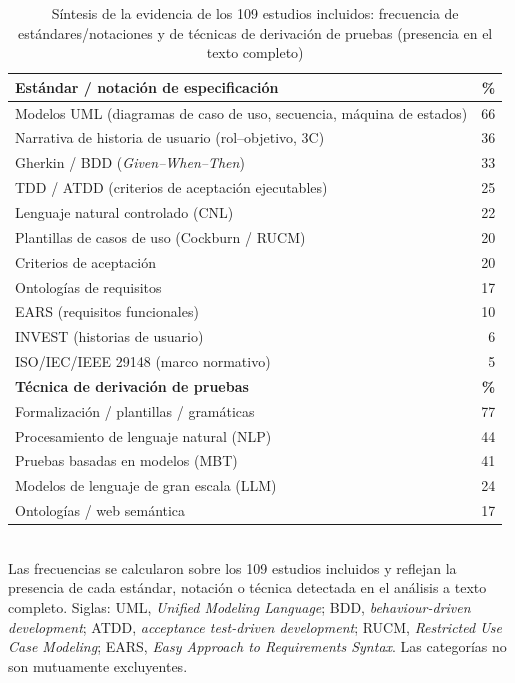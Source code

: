 \documentclass[10pt,journal,twoside,letterpaper]{IEEEtran}
\begin{document}
    \begin{table}[!tb]
        \caption{Síntesis de la evidencia de los 109 estudios incluidos: frecuencia de estándares/notaciones y de técnicas de derivación de pruebas (presencia en el texto completo)}
        \label{tab:sintesis}
        \centering
        \small
        \setlength{\tabcolsep}{6pt}
        \begin{tabular}{@{}p{6.9cm}r@{}}
            \toprule
            \textbf{Estándar / notación de especificación} & \textbf{\%} \\
            \midrule
            Modelos UML (diagramas de caso de uso, secuencia, máquina de estados) & 66 \\
            Narrativa de historia de usuario (rol--objetivo, 3C) & 36 \\
            Gherkin / BDD (\emph{Given--When--Then}) & 33 \\
            TDD / ATDD (criterios de aceptación ejecutables) & 25 \\
            Lenguaje natural controlado (CNL) & 22 \\
            Plantillas de casos de uso (Cockburn / RUCM) & 20 \\
            Criterios de aceptación & 20 \\
            Ontologías de requisitos & 17 \\
            EARS (requisitos funcionales) & 10 \\
            INVEST (historias de usuario) & 6 \\
            ISO/IEC/IEEE 29148 (marco normativo) & 5 \\
            \midrule
            \textbf{Técnica de derivación de pruebas} & \textbf{\%} \\
            \midrule
            Formalización / plantillas / gramáticas & 77 \\
            Procesamiento de lenguaje natural (NLP) & 44 \\
            Pruebas basadas en modelos (MBT) & 41 \\
            Modelos de lenguaje de gran escala (LLM) & 24 \\
            Ontologías / web semántica & 17 \\
            \bottomrule
        \end{tabular}
        \\[3pt]
        {\footnotesize Las frecuencias se calcularon sobre los 109 estudios incluidos y reflejan la presencia de cada estándar, notación o técnica detectada en el análisis a texto completo. Siglas: UML, \emph{Unified Modeling Language}; BDD, \emph{behaviour-driven development}; ATDD, \emph{acceptance test-driven development}; RUCM, \emph{Restricted Use Case Modeling}; EARS, \emph{Easy Approach to Requirements Syntax}. Las categorías no son mutuamente excluyentes.}
    \end{table}
    
\end{document}
